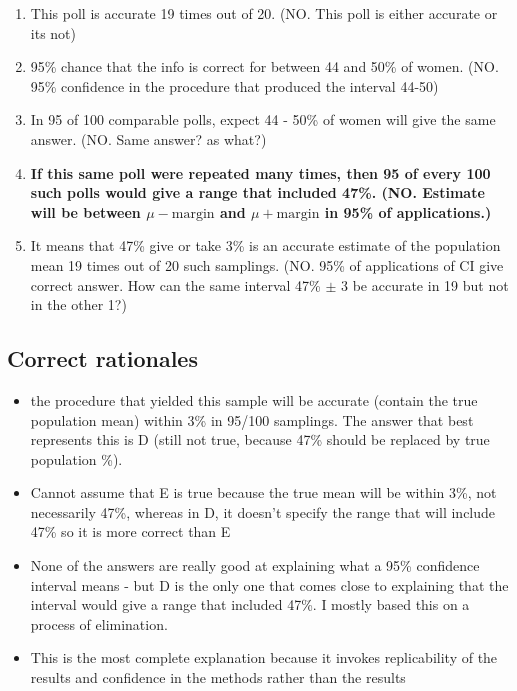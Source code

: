 \documentclass[letterpaper,12pt,twoside,printwatermark=false]{pinp}
\providecommand{\tightlist}{%
  \setlength{\itemsep}{0pt}\setlength{\parskip}{0pt}}
\begin{document}
\begin{enumerate}
\def\labelenumi{\alph{enumi}.}
\tightlist
\item
  This poll is accurate 19 times out of 20. (NO. This poll is either
  accurate or its not)
\item
  95\% chance that the info is correct for between 44 and 50\% of women.
  (NO. 95\% confidence in the procedure that produced the interval
  44-50)
\item
  In 95 of 100 comparable polls, expect 44 - 50\% of women will give the
  same answer. (NO. Same answer? as what?)
\item
  \textbf{If this same poll were repeated many times, then 95 of every
  100 such polls would give a range that included 47\%. (NO. Estimate
  will be between \(\mu - \textrm{margin}\) and
  \(\mu + \textrm{margin}\) in 95\% of applications.)}
\item
  It means that 47\% give or take 3\% is an accurate estimate of the
  population mean 19 times out of 20 such samplings. (NO. 95\% of
  applications of CI give correct answer. How can the same interval 47\%
  \(\pm\) 3 be accurate in 19 but not in the other 1?)
\end{enumerate}

\hypertarget{correct-rationales-5}{%
\subsection{Correct rationales}\label{correct-rationales-5}}

\begin{itemize}
\tightlist
\item
  the procedure that yielded this sample will be accurate (contain the
  true population mean) within 3\% in 95/100 samplings. The answer that
  best represents this is D (still not true, because 47\% should be
  replaced by true population \%).
\item
  Cannot assume that E is true because the true mean will be within 3\%,
  not necessarily 47\%, whereas in D, it doesn't specify the range that
  will include 47\% so it is more correct than E
\item
  None of the answers are really good at explaining what a 95\%
  confidence interval means - but D is the only one that comes close to
  explaining that the interval would give a range that included 47\%. I
  mostly based this on a process of elimination.
\item
  This is the most complete explanation because it invokes replicability
  of the results and confidence in the methods rather than the results
\end{itemize}
\end{document}

